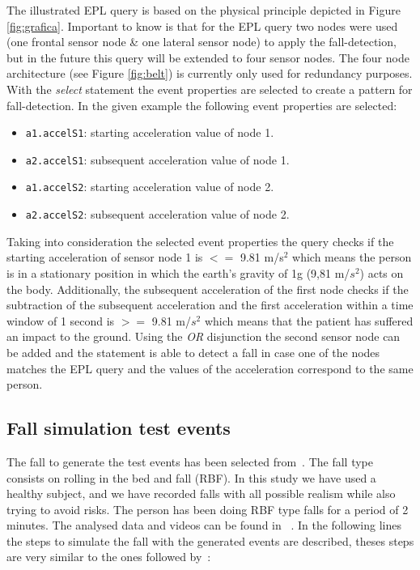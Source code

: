 \documentclass[journal]{IEEEtran}
\begin{document}
The illustrated EPL query is based on the physical principle depicted in 
Figure \ref{fig:grafica}. Important to know is that for the EPL query two nodes 
were used (one frontal sensor node \& one lateral sensor node) to apply the 
fall-detection, but in the future this query will be extended to four sensor nodes. 
The four node architecture (see Figure \ref{fig:belt}) is currently only used 
for redundancy purposes. With the \textit{select} statement the event properties 
are selected to create a pattern for fall-detection. In the given example the
following event properties are selected:

\begin{itemize}
 \item \texttt{\small{a1.accelS1}}: starting acceleration value of node 1.
 \item \texttt{\small{a2.accelS1}}: subsequent acceleration value of node 1.
 \item \texttt{\small{a1.accelS2}}: starting acceleration value of node 2.
 \item \texttt{\small{a2.accelS2}}: subsequent acceleration value of node 2.
\end{itemize}

Taking into consideration the selected event properties the query checks if the 
starting acceleration of sensor node 1 is $<=$ 9.81 m/s$^2$ which means the person 
is in a stationary position in which the earth's gravity of 1g (9,81 m/$s^2$) acts 
on the body. Additionally, the subsequent acceleration of the first node checks if the subtraction of the subsequent acceleration and the first acceleration within a 
time window of 1 second is $>=$ 9.81 m/$s^2$ which means that the patient has 
suffered an impact to the ground. Using the \textit{OR} disjunction the second 
sensor node can be added and the statement is able to detect a fall in case one 
of the nodes matches the EPL query and the values of the acceleration correspond 
to the same person. 
 
\subsection{Fall simulation test events} 

The fall to generate the test events has been selected from~\cite{Li2009,Pannurat2014}. 
The fall type consists on rolling in the bed and fall (RBF). In this study we have used a 
healthy subject, and we have recorded falls with all possible realism while also
trying to avoid risks. The person has been doing RBF type falls for a period of 2 minutes. The analysed 
data and videos can be found in ~\cite{FallRepo}. In the following lines the steps to simulate 
the fall with the generated events are described, theses steps are very similar to the 
ones followed by~\cite{colladomachine,colladoTriaxal}:
\end{document}
